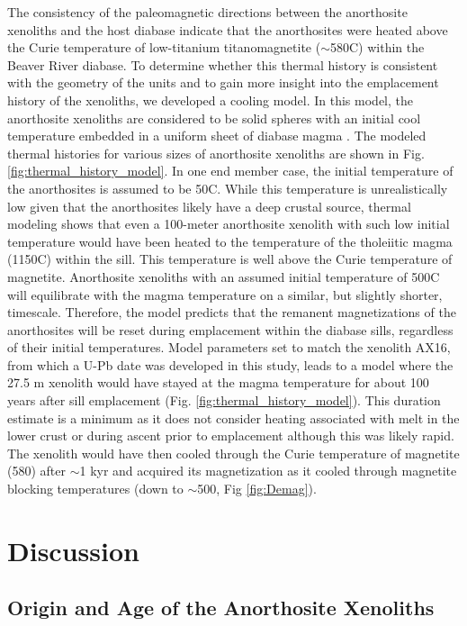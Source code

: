 \documentclass[draft]{agujournal2019}
\begin{document}
The consistency of the paleomagnetic directions between the anorthosite xenoliths and the host diabase indicate that the anorthosites were heated above the Curie temperature of low-titanium titanomagnetite ($\sim$580\textdegree C) within the Beaver River diabase. To determine whether this thermal history is consistent with the geometry of the units and to gain more insight into the emplacement history of the xenoliths, we developed a cooling model. In this model, the anorthosite xenoliths are considered to be solid spheres with an initial cool temperature embedded in a uniform sheet of diabase magma \cite{Delaney1987a, Unsworth1979a}. The modeled thermal histories for various sizes of anorthosite xenoliths are shown in Fig. \ref{fig:thermal_history_model}. In one end member case, the initial temperature of the anorthosites is assumed to be 50\textdegree C. While this temperature is unrealistically low given that the anorthosites likely have a deep crustal source, thermal modeling shows that even a 100-meter anorthosite xenolith with such low initial temperature would have been heated to the temperature of the tholeiitic magma (1150\textdegree C) within the sill. This temperature is well above the Curie temperature of magnetite. Anorthosite xenoliths with an assumed initial temperature of 500\textdegree C will equilibrate with the magma temperature on a similar, but slightly shorter, timescale. Therefore, the model predicts that the remanent magnetizations of the anorthosites will be reset during emplacement within the diabase sills, regardless of their initial temperatures. Model parameters set to match the xenolith AX16, from which a U-Pb date was developed in this study, leads to a model where the 27.5 m xenolith would have stayed at the magma temperature for about 100 years after sill emplacement (Fig. \ref{fig:thermal_history_model}). This duration estimate is a minimum as it does not consider heating associated with melt in the lower crust or during ascent prior to emplacement although this was likely rapid. The xenolith would have then cooled through the Curie temperature of magnetite (580\textdegree) after $\sim$1 kyr and acquired its magnetization as it cooled through magnetite blocking temperatures (down to $\sim$500\textdegree, Fig \ref{fig:Demag}).

\section{Discussion}
\subsection{Origin and Age of the Anorthosite Xenoliths}
\end{document}
